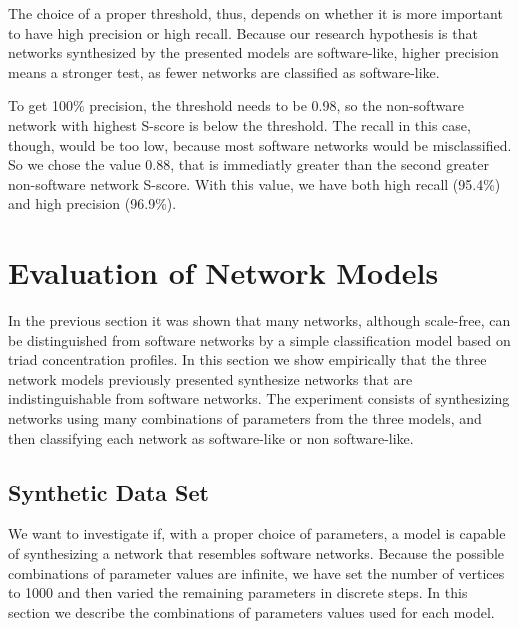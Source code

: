 The choice of a proper threshold, thus, depends on whether it is more important
to have high precision or high recall. Because our research hypothesis is that
networks synthesized by the presented models are software-like, higher precision
means a stronger test, as fewer networks are classified as software-like.

To get 100\% precision, the threshold needs to be 0.98, so the non-software
network with highest S-score is below the threshold. The recall in this case,
though, would be too low, because most software networks would be misclassified.
So we chose the value 0.88, that is immediatly greater than the second greater
non-software network S-score. With this value, we have both high recall (95.4\%)
and high precision (96.9\%).



\section{Evaluation of Network Models} \label{sec:evaluation}

In the previous section it was shown that many networks, although scale-free,
can be distinguished from software networks by a simple classification model
based on triad concentration profiles. In this section we show empirically that
the three network models previously presented synthesize networks that are
indistinguishable from software networks.
The experiment consists of synthesizing networks using many combinations of
parameters from the three models, and then classifying each network as
software-like or non software-like. %

\subsection{Synthetic Data Set}

We want to investigate if, with a proper choice of parameters, a model is
capable of synthesizing a network that resembles software networks. Because the
possible combinations of parameter values are infinite, we have set the number
of vertices to 1000 and then varied the remaining parameters in discrete steps.
In this section we describe the combinations of parameters values used for each
model.

